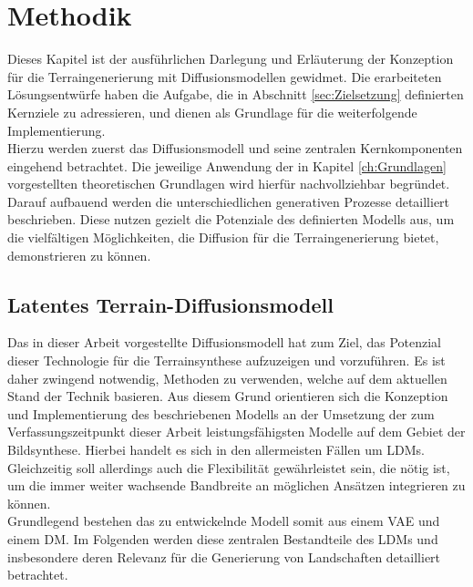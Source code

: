 \chapter{Methodik}
\label{ch:Methodik}

Dieses Kapitel ist der ausführlichen Darlegung und Erläuterung der Konzeption für die Terraingenerierung mit Diffusionsmodellen gewidmet. Die erarbeiteten Lösungsentwürfe haben die Aufgabe, die in Abschnitt \ref{sec:Zielsetzung} definierten Kernziele zu adressieren, und dienen als Grundlage für die weiterfolgende Implementierung. \\
Hierzu werden zuerst das Diffusionsmodell und seine zentralen Kernkomponenten eingehend betrachtet. Die jeweilige Anwendung der in Kapitel \ref{ch:Grundlagen} vorgestellten theoretischen Grundlagen wird hierfür nachvollziehbar begründet. \\
Darauf aufbauend werden die unterschiedlichen generativen Prozesse detailliert beschrieben. Diese nutzen gezielt die Potenziale des definierten Modells aus, um die vielfältigen Möglichkeiten, die Diffusion für die Terraingenerierung bietet, demonstrieren zu können.

\section {Latentes Terrain-Diffusionsmodell}
\label{sec:Planung_LDM}

Das in dieser Arbeit vorgestellte Diffusionsmodell hat zum Ziel, das Potenzial dieser Technologie für die Terrainsynthese aufzuzeigen und vorzuführen. Es ist daher zwingend notwendig, Methoden zu verwenden, welche auf dem aktuellen Stand der Technik basieren. Aus diesem Grund orientieren sich die Konzeption und Implementierung des beschriebenen Modells an der Umsetzung der zum Verfassungszeitpunkt dieser Arbeit leistungsfähigsten Modelle auf dem Gebiet der Bildsynthese. Hierbei handelt es sich in den allermeisten Fällen um \ac{LDM}s. Gleichzeitig soll allerdings auch die Flexibilität gewährleistet sein, die nötig ist, um die immer weiter wachsende Bandbreite an möglichen Ansätzen integrieren zu können.\\
Grundlegend bestehen das zu entwickelnde Modell somit aus einem \ac{VAE} und einem \ac{DM}. Im Folgenden werden diese zentralen Bestandteile des \ac{LDM}s und insbesondere deren Relevanz für die Generierung von Landschaften detailliert betrachtet.

